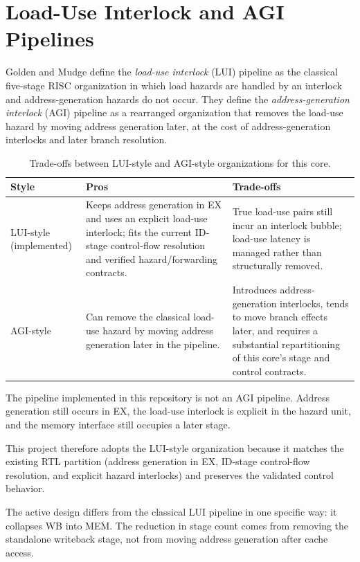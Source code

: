 \documentclass[11pt,a4paper]{article}
\begin{document}
\section{Load-Use Interlock and AGI Pipelines}

Golden and Mudge define the \emph{load-use interlock} (LUI) pipeline as the classical five-stage RISC organization in which load hazards are handled by an interlock and address-generation hazards do not occur. They define the \emph{address-generation interlock} (AGI) pipeline as a rearranged organization that removes the load-use hazard by moving address generation later, at the cost of address-generation interlocks and later branch resolution.\cite{goldenmudge}

\begin{table}[H]
\caption{Trade-offs between LUI-style and AGI-style organizations for this core.}
\centering
\begin{tabularx}{\linewidth}{@{}>{\ttfamily}lXX@{}}
\toprule
Style & Pros & Trade-offs \\
\midrule
LUI-style (implemented) & Keeps address generation in EX and uses an explicit load-use interlock; fits the current ID-stage control-flow resolution and verified hazard/forwarding contracts. & True load-use pairs still incur an interlock bubble; load-use latency is managed rather than structurally removed. \\
AGI-style & Can remove the classical load-use hazard by moving address generation later in the pipeline. & Introduces address-generation interlocks, tends to move branch effects later, and requires a substantial repartitioning of this core's stage and control contracts. \\
\bottomrule
\end{tabularx}
\label{tab:lui_agi_tradeoffs}
\end{table}

The pipeline implemented in this repository is not an AGI pipeline. Address generation still occurs in EX, the load-use interlock is explicit in the hazard unit, and the memory interface still occupies a later stage.

This project therefore adopts the LUI-style organization because it matches the existing RTL partition (address generation in EX, ID-stage control-flow resolution, and explicit hazard interlocks) and preserves the validated control behavior.

The active design differs from the classical LUI pipeline in one specific way: it collapses WB into MEM. The reduction in stage count comes from removing the standalone writeback stage, not from moving address generation after cache access.\cite{goldenmudge}
\end{document}
